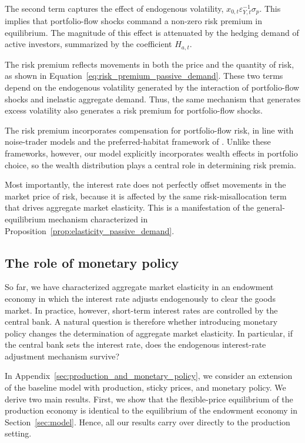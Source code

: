 \documentclass[12pt,english]{article}
\begin{document}
The second term captures the effect of endogenous volatility, $x_{0,t}\varepsilon_{Y,t}^{-1}\sigma_p$.
This implies that portfolio-flow shocks command a non-zero risk premium in equilibrium.
The magnitude of this effect is attenuated by the hedging demand of active investors, summarized by the coefficient $H_{a,t}$.

The risk premium reflects movements in both the price and the quantity of risk, as shown in Equation~\eqref{eq:risk_premium_passive_demand}.
These two terms depend on the endogenous volatility generated by the interaction of portfolio-flow shocks and inelastic aggregate demand.
Thus, the same mechanism that generates excess volatility also generates a risk premium for portfolio-flow shocks.

The risk premium incorporates compensation for portfolio-flow risk, in line with noise-trader models \citep[see, e.g.,][]{DeLong/Shleifer/Summers/Wladmann/1990} and the preferred-habitat framework of \citet{VayanosVila2021}.
Unlike these frameworks, however, our model explicitly incorporates wealth effects in portfolio choice, so the wealth distribution plays a central role in determining risk premia.

Most importantly, the interest rate does not perfectly offset movements in the market price of risk, because it is affected by the same risk-misallocation term that drives aggregate market elasticity.
This is a manifestation of the general-equilibrium mechanism characterized in Proposition~\ref{prop:elasticity_passive_demand}.

\subsection{The role of monetary policy}

So far, we have characterized aggregate market elasticity in an endowment economy in which the interest rate adjusts endogenously to clear the goods market.
In practice, however, short-term interest rates are controlled by the central bank.
A natural question is therefore whether introducing monetary policy changes the determination of aggregate market elasticity.
In particular, if the central bank sets the interest rate, does the endogenous interest-rate adjustment mechanism survive?

In Appendix~\ref{sec:production_and_monetary_policy}, we consider an extension of the baseline model with production, sticky prices, and monetary policy.
We derive two main results.
First, we show that the flexible-price equilibrium of the production economy is identical to the equilibrium of the endowment economy in Section~\ref{sec:model}.
Hence, all our results carry over directly to the production setting.
\end{document}
